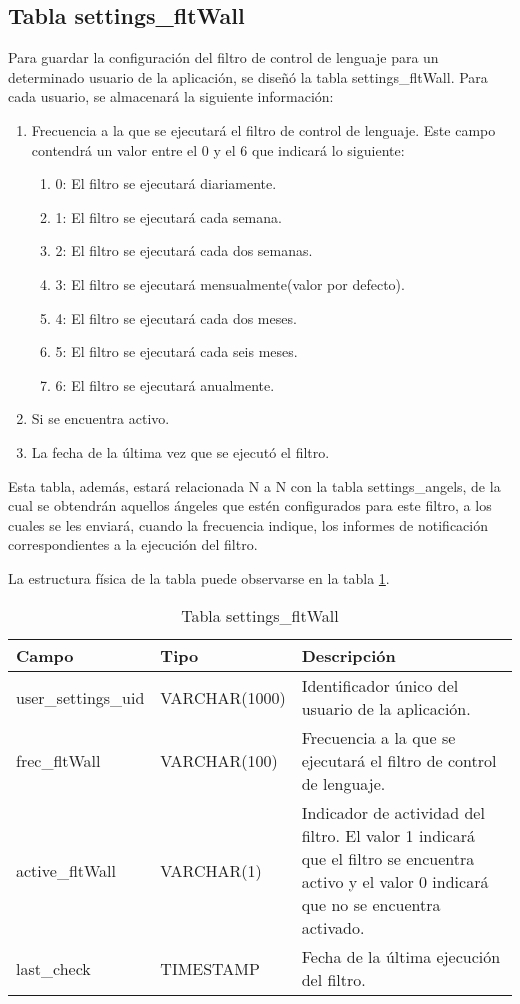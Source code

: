 \subsection{Tabla settings\_fltWall}
Para guardar la configuración del filtro de control de lenguaje para un determinado usuario de la aplicación, se diseñó la tabla settings\_fltWall. Para cada usuario, se almacenará la siguiente información:
\begin{enumerate}
\item Frecuencia a la que se ejecutará el filtro de control de lenguaje. Este campo contendrá un valor entre el 0 y el 6 que indicará lo siguiente:
\begin{enumerate}
\item 0: El filtro se ejecutará diariamente.
\item 1: El filtro se ejecutará cada semana.
\item 2: El filtro se ejecutará cada dos semanas.
\item 3: El filtro se ejecutará mensualmente(valor por defecto).
\item 4: El filtro se ejecutará cada dos meses.
\item 5: El filtro se ejecutará cada seis meses.
\item 6: El filtro se ejecutará anualmente.
\end{enumerate}
\item Si se encuentra activo.
\item La fecha de la última vez que se ejecutó el filtro.
\end{enumerate}
\bigskip
\par
Esta tabla, además, estará relacionada N a N con la tabla settings\_angels, de la cual se obtendrán aquellos ángeles que estén configurados para este filtro, a los cuales se les enviará, cuando la frecuencia indique, los informes de notificación correspondientes a la ejecución del filtro.
\bigskip
\par
La estructura física de la tabla puede observarse en la tabla \ref{tabSettingsFltWall}.
\begin{table}
\begin{center}
\begin{tabular}[c]{| l | l | p{60mm} |}\hline
\textbf{Campo}&\textbf{Tipo}&\textbf{Descripción} \\ \hline
user\_settings\_uid & VARCHAR(1000) & Identificador único del usuario de la aplicación. \\ \hline
frec\_fltWall & VARCHAR(100) & Frecuencia a la que se ejecutará el filtro de control de lenguaje. \\ \hline
active\_fltWall & VARCHAR(1) & Indicador de actividad del filtro. El valor 1 indicará que el filtro se encuentra activo y el valor 0 indicará que no se encuentra activado. \\ \hline
last\_check & TIMESTAMP & Fecha de la última ejecución del filtro. \\ \hline
\end{tabular}
\end{center}
\caption{Tabla settings\_fltWall} \label{tabSettingsFltWall}
\end{table}

